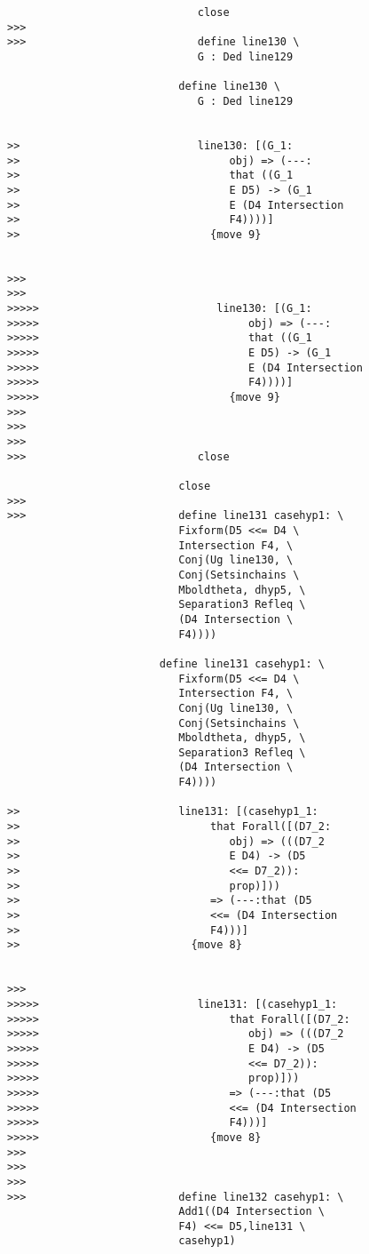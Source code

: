 \documentclass[12pt]{article}
\begin{document}
\begin{verbatim}
                              close
>>>
>>>                           define line130 \
                              G : Ded line129

                           define line130 \
                              G : Ded line129


>>                            line130: [(G_1:
>>                                 obj) => (---:
>>                                 that ((G_1
>>                                 E D5) -> (G_1
>>                                 E (D4 Intersection
>>                                 F4))))]
>>                              {move 9}


>>>
>>>
>>>>>                            line130: [(G_1:
>>>>>                                 obj) => (---:
>>>>>                                 that ((G_1
>>>>>                                 E D5) -> (G_1
>>>>>                                 E (D4 Intersection
>>>>>                                 F4))))]
>>>>>                              {move 9}
>>>
>>>
>>>
>>>                           close

                           close
>>>
>>>                        define line131 casehyp1: \
                           Fixform(D5 <<= D4 \
                           Intersection F4, \
                           Conj(Ug line130, \
                           Conj(Setsinchains \
                           Mboldtheta, dhyp5, \
                           Separation3 Refleq \
                           (D4 Intersection \
                           F4))))

                        define line131 casehyp1: \
                           Fixform(D5 <<= D4 \
                           Intersection F4, \
                           Conj(Ug line130, \
                           Conj(Setsinchains \
                           Mboldtheta, dhyp5, \
                           Separation3 Refleq \
                           (D4 Intersection \
                           F4))))

>>                         line131: [(casehyp1_1:
>>                              that Forall([(D7_2:
>>                                 obj) => (((D7_2
>>                                 E D4) -> (D5
>>                                 <<= D7_2)):
>>                                 prop)]))
>>                              => (---:that (D5
>>                              <<= (D4 Intersection
>>                              F4)))]
>>                           {move 8}


>>>
>>>>>                         line131: [(casehyp1_1:
>>>>>                              that Forall([(D7_2:
>>>>>                                 obj) => (((D7_2
>>>>>                                 E D4) -> (D5
>>>>>                                 <<= D7_2)):
>>>>>                                 prop)]))
>>>>>                              => (---:that (D5
>>>>>                              <<= (D4 Intersection
>>>>>                              F4)))]
>>>>>                           {move 8}
>>>
>>>
>>>
>>>                        define line132 casehyp1: \
                           Add1((D4 Intersection \
                           F4) <<= D5,line131 \
                           casehyp1)


\end{verbatim}
\end{document}
